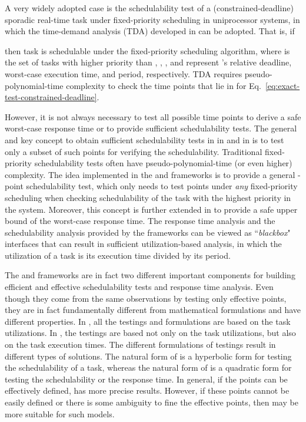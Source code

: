 \documentclass[10pt,conference]{IEEEtran}
\newcommand{\frameworkkq}[1]{}
\newcommand{\frameworkku}[1]{}
\begin{document}
A very widely adopted case is the schedulability test of a
(constrained-deadline) sporadic real-time task  under
fixed-priority scheduling in uniprocessor systems, in which the
time-demand analysis (TDA) developed in
\cite{DBLP:conf/rtss/LehoczkySD89} can be adopted. That is, if

then task  is schedulable under the fixed-priority scheduling algorithm, where  is the set of tasks with higher priority than , , , and  represent 's relative deadline, worst-case execution time, and period, respectively. TDA requires pseudo-polynomial-time complexity to check the time points that lie in  for Eq.~\eqref{eq:exact-test-constrained-deadline}. 

However, it is not always necessary to test all possible time points
to derive a safe worst-case response time or to provide sufficient
schedulability tests.
The general and key concept to obtain sufficient schedulability tests in
\frameworkku{} in \cite{DBLP:journals/corr/abs-1501.07084,DBLP:conf/rtss/ChenHL15} and
\frameworkkq{} in \cite{DBLP:journals/corr/abs-kRTA,DBLP:conf/rtss/ChenHL16} is to test only a
subset of such points for verifying the schedulability. 
Traditional fixed-priority schedulability tests often have
pseudo-polynomial-time (or even higher) complexity. 
The idea
implemented in the \frameworkku{} and \frameworkkq{} frameworks  is to 
provide a general -point schedulability test, which
only needs to test  points under \textit{any} fixed-priority
scheduling when checking schedulability of the task with the 
highest priority in the system.  Moreover, this concept is further
extended in \frameworkkq{} to provide a safe upper bound of the
worst-case response time. The response time analysis and the
schedulability analysis provided by the frameworks can be viewed as
``\emph{blackbox}" interfaces that can result in sufficient utilization-based
analysis, in which the utilization of a task is its execution time
divided by its period.

The \frameworkku{} and \frameworkkq{}
frameworks are in fact two different important components for building
efficient and effective schedulability tests and response time
analysis. Even though they come from the same observations by testing
only  effective points, they are in fact fundamentally different
from mathematical formulations and have different properties.  In
\frameworkku{}, all the testings and formulations are based on the
task utilizations.  In \frameworkkq{}, the testings are based not only
on the task utilizations, but also on the task execution times.  The
different formulations of testings result in different types of
solutions.  The natural form of \frameworkku{} is a hyperbolic form
for testing the schedulability of a task, whereas the natural form of
\frameworkkq{} is a quadratic form for testing the schedulability or the
response time. In general, if the  points can be effectively
defined, \frameworkku{} has more precise results. However, if these
 points cannot be easily defined or there is some ambiguity to fine
the effective points, then \frameworkkq{} may be more suitable for such
models.
\end{document}
